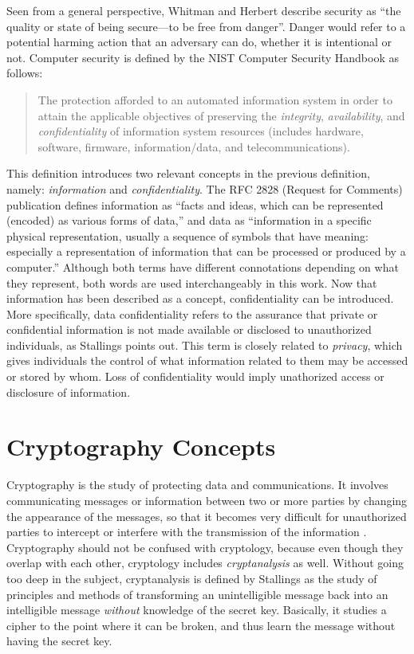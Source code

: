 Seen from a general perspective, Whitman and Herbert \cite{PrinciplesInformationSecurity} describe security as ``the quality or state of being secure---to be free from danger''. Danger would refer to a potential harming action that an adversary can do, whether it is intentional or not. Computer security is defined by the NIST Computer Security Handbook \cite{NIST95} as follows:
\begin{quotation}
The protection afforded to an automated information system in order to attain the applicable objectives of preserving the \emph{integrity}, \emph{availability}, and \emph{confidentiality} of information system resources (includes hardware, software, firmware, information/data, and telecommunications).
\end{quotation}
This definition introduces two relevant concepts in the previous definition, namely: \emph{information} and \emph{confidentiality}. The RFC 2828 (Request for Comments) publication \cite{shirey2000rfc} defines information as ``facts and ideas, which can be represented (encoded) as various forms of data,'' and data as ``information in a specific physical representation, usually a sequence of symbols that have meaning: especially a representation of information that can be processed or produced by a computer.'' Although both terms have different connotations depending on what they represent, both words are used interchangeably in this work. Now that information has been described as a concept, confidentiality can be introduced. More specifically, data confidentiality refers to the assurance that private or confidential information is not made available or disclosed to unauthorized individuals, as Stallings \cite{CryptoStallings} points out. This term is closely related to \textit{privacy}, which gives individuals the control of what information related to them may be accessed or stored by whom. Loss of confidentiality would imply unathorized access or disclosure of information.

\section{Cryptography Concepts}

Cryptography is the study of protecting data and communications. It involves communicating messages or information between two or more parties by changing the appearance of the messages, so that it becomes very difficult for unauthorized parties to intercept or interfere with the transmission of the information \cite{IntroCryptoMath}. Cryptography should not be confused with cryptology, because even though they overlap with each other, cryptology includes \emph{cryptanalysis} as well. Without going too deep in the subject, cryptanalysis is defined by Stallings \cite{CryptoStallings}  as the study of principles and methods of transforming an unintelligible message back into an intelligible message \emph{without} knowledge of the secret key. Basically, it studies a cipher to the point where it can be broken, and thus learn the message without having the secret key.

